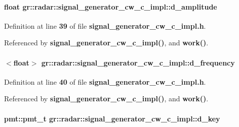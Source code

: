 \paragraph[{d\+\_\+amplitude}]{\setlength{\rightskip}{0pt plus 5cm}float gr\+::radar\+::signal\+\_\+generator\+\_\+cw\+\_\+c\+\_\+impl\+::d\+\_\+amplitude}\label{classgr_1_1radar_1_1signal__generator__cw__c__impl_a420cd3d448bc039c1dcaa12eb661c79f}


Definition at line {\bf 39} of file {\bf signal\+\_\+generator\+\_\+cw\+\_\+c\+\_\+impl.\+h}.



Referenced by {\bf signal\+\_\+generator\+\_\+cw\+\_\+c\+\_\+impl()}, and {\bf work()}.

\paragraph[{d\+\_\+frequency}]{$<$float$>$ gr\+::radar\+::signal\+\_\+generator\+\_\+cw\+\_\+c\+\_\+impl\+::d\+\_\+frequency}\label{classgr_1_1radar_1_1signal__generator__cw__c__impl_a6fed7284adcb76d4971fa2875e244b22}


Definition at line {\bf 40} of file {\bf signal\+\_\+generator\+\_\+cw\+\_\+c\+\_\+impl.\+h}.



Referenced by {\bf signal\+\_\+generator\+\_\+cw\+\_\+c\+\_\+impl()}, and {\bf work()}.

\paragraph[{d\+\_\+key}]{\setlength{\rightskip}{0pt plus 5cm}pmt\+::pmt\+\_\+t gr\+::radar\+::signal\+\_\+generator\+\_\+cw\+\_\+c\+\_\+impl\+::d\+\_\+key}\label{classgr_1_1radar_1_1signal__generator__cw__c__impl_abfdf4ea42fd5937904a684220c1459ab}


